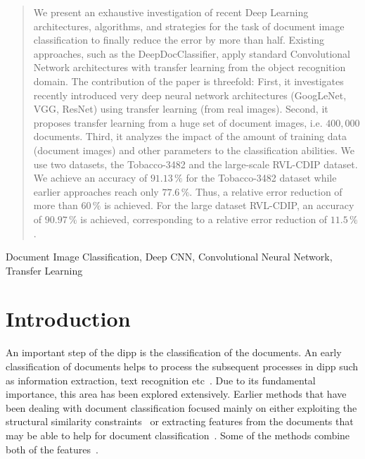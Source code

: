 \documentclass[conference]{IEEEtran}
\begin{document}
\IEEEpeerreviewmaketitle
\begin{abstract}



We present an exhaustive investigation of recent Deep Learning architectures, algorithms, and strategies for the task of document image classification to finally reduce the error by more than half.
Existing approaches, such as the DeepDocClassifier, apply standard Convolutional Network architectures with transfer learning from the object recognition domain.
The contribution of the paper is threefold:
First, it investigates recently introduced very deep neural network architectures (GoogLeNet, VGG, ResNet) using transfer learning (from real images). 
Second, it proposes transfer learning from a huge set of document images, i.e. $400,000$ documents. 
Third, it analyzes the impact of the amount of training data (document images) and other parameters to the classification abilities. 
We use two datasets, the Tobacco-3482 and the large-scale RVL-CDIP dataset.
We achieve an accuracy of $91.13\,\%$ for the Tobacco-3482 dataset while earlier approaches reach only $77.6\,\%$. Thus, a relative error reduction of more than $60\,\%$ is achieved. For the large dataset RVL-CDIP, an accuracy of $90.97\,\%$ is achieved, corresponding to a relative error reduction of $11.5\,\%$.














\end{abstract}

\begin{IEEEkeywords}
Document Image Classification, Deep CNN, Convolutional Neural Network, Transfer Learning
\end{IEEEkeywords}



%
 
\section{Introduction}

An important step of the \ac{dipp} is the classification of the documents. 
An early classification of documents helps to process the subsequent processes in \ac{dipp} such as information extraction, text recognition etc~\cite{doclass_Dengel95}. Due to its fundamental importance, this area has been explored extensively. 
Earlier methods that have been dealing with document classification focused mainly on either exploiting the structural similarity constraints~\cite{doclass_Byun2000, doclass_shin} or extracting features from the documents that may be able to help for  document classification~\cite{doclass_Kumar12, doclass_Chen12, doclass_Kumar14}.
Some of the methods  combine both of the features~\cite{Collins-thompson02aclustering-based}.
\end{document}
